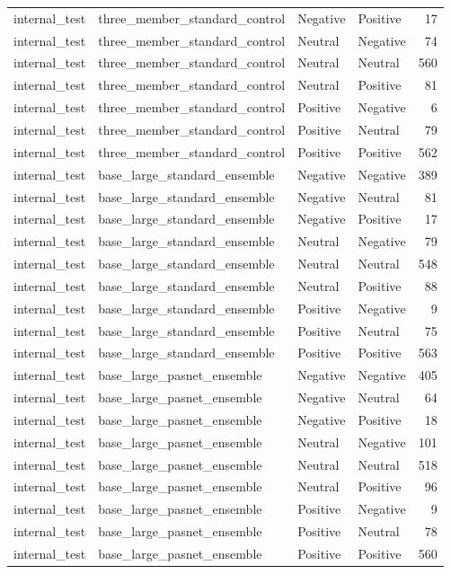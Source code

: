 \begin{tabular}{llllr}
internal\_test & three\_member\_standard\_control & Negative & Positive & 17 \\
internal\_test & three\_member\_standard\_control & Neutral & Negative & 74 \\
internal\_test & three\_member\_standard\_control & Neutral & Neutral & 560 \\
internal\_test & three\_member\_standard\_control & Neutral & Positive & 81 \\
internal\_test & three\_member\_standard\_control & Positive & Negative & 6 \\
internal\_test & three\_member\_standard\_control & Positive & Neutral & 79 \\
internal\_test & three\_member\_standard\_control & Positive & Positive & 562 \\
internal\_test & base\_large\_standard\_ensemble & Negative & Negative & 389 \\
internal\_test & base\_large\_standard\_ensemble & Negative & Neutral & 81 \\
internal\_test & base\_large\_standard\_ensemble & Negative & Positive & 17 \\
internal\_test & base\_large\_standard\_ensemble & Neutral & Negative & 79 \\
internal\_test & base\_large\_standard\_ensemble & Neutral & Neutral & 548 \\
internal\_test & base\_large\_standard\_ensemble & Neutral & Positive & 88 \\
internal\_test & base\_large\_standard\_ensemble & Positive & Negative & 9 \\
internal\_test & base\_large\_standard\_ensemble & Positive & Neutral & 75 \\
internal\_test & base\_large\_standard\_ensemble & Positive & Positive & 563 \\
internal\_test & base\_large\_pasnet\_ensemble & Negative & Negative & 405 \\
internal\_test & base\_large\_pasnet\_ensemble & Negative & Neutral & 64 \\
internal\_test & base\_large\_pasnet\_ensemble & Negative & Positive & 18 \\
internal\_test & base\_large\_pasnet\_ensemble & Neutral & Negative & 101 \\
internal\_test & base\_large\_pasnet\_ensemble & Neutral & Neutral & 518 \\
internal\_test & base\_large\_pasnet\_ensemble & Neutral & Positive & 96 \\
internal\_test & base\_large\_pasnet\_ensemble & Positive & Negative & 9 \\
internal\_test & base\_large\_pasnet\_ensemble & Positive & Neutral & 78 \\
internal\_test & base\_large\_pasnet\_ensemble & Positive & Positive & 560 \\
\bottomrule
\end{tabular}
